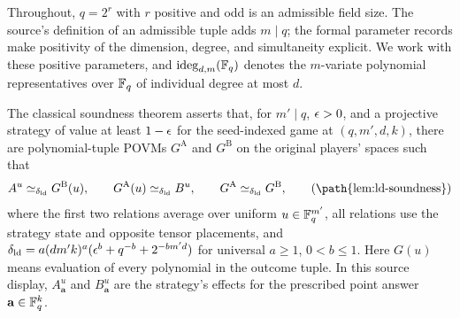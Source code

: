 \documentclass[11pt]{article}
\begin{document}
Throughout, $q = 2^r$ with $r$ positive and odd is an admissible field size.
The source's definition of an admissible tuple adds $m\mid q$; the
formal parameter records make positivity of the dimension, degree, and
simultaneity explicit. We work with these positive parameters, and
$\mathrm{ideg}_{d,m}(\mathbb{F}_q)$ denotes the $m$-variate polynomial representatives
over $\mathbb{F}_q$ of individual degree at most $d$.

The classical soundness theorem asserts that, for $m'\mid q$, $\epsilon>0$,
and a projective strategy of value at least $1-\epsilon$ for the seed-indexed
game at $(q,m',d,k)$, there are polynomial-tuple POVMs $G^{\mathrm A}$ and
$G^{\mathrm B}$ on the original players' spaces such that
\[
 A^u\simeq_{\delta_{\rm ld}}G^{\mathrm B}(u),\qquad
 G^{\mathrm A}(u)\simeq_{\delta_{\rm ld}}B^u,\qquad
 G^{\mathrm A}\simeq_{\delta_{\rm ld}}G^{\mathrm B},
 \tag{\path{lem:ld-soundness}}
\]
where the first two relations average over uniform $u\in\mathbb{F}_q^{m'}$, all
relations use the strategy state and opposite tensor placements, and
$\delta_{\rm ld}=a(dm'k)^a(\epsilon^b+q^{-b}+2^{-bm'd})$ for universal
$a\ge1$, $0<b\le1$. Here $G(u)$ means evaluation of every polynomial in
the outcome tuple. In this source display, $A^u_{\mathbf a}$ and
$B^u_{\mathbf a}$ are the strategy's effects for the prescribed point
answer $\mathbf a\in\mathbb{F}_q^k$.
\end{document}
